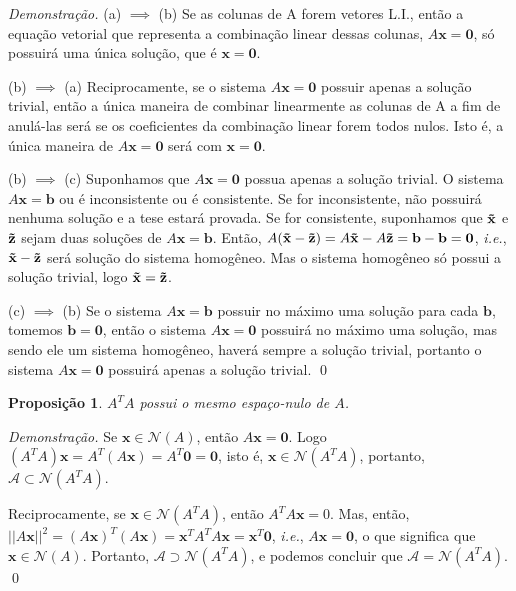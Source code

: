 \documentclass[a4paper, 12pt]{article}
\newtheorem{proposicao}{Proposição}
\theoremstyle{definition}
\newenvironment{demonstracao}{\noindent\textit{Demonstração.}}{\qed}
\theoremstyle{remark}
\begin{document}
\begin{demonstracao}
(a) $\implies$ (b) Se as colunas de A forem vetores L.I., então a equação vetorial que representa a combinação linear dessas colunas, $A\mathbf{x} = \mathbf{0}$, só possuirá uma única solução, que é $\mathbf{x} = \mathbf{0}$.

(b) $\implies$ (a) Reciprocamente, se o sistema $A\mathbf{x} = \mathbf{0}$ possuir apenas a solução trivial, então a única maneira de combinar linearmente as colunas de A a fim de anulá-las será se os coeficientes da combinação linear forem todos nulos. Isto é, a única maneira de $A\mathbf{x} = \mathbf{0}$ será com $\mathbf{x} = \mathbf{0}$.

(b) $\implies$ (c) Suponhamos que $A\mathbf{x} = \mathbf{0}$ possua apenas a solução trivial. O sistema $A\mathbf{x} = \mathbf{b}$ ou é inconsistente ou é consistente. Se for inconsistente, não possuirá nenhuma solução e a tese estará provada. Se for consistente, suponhamos que $\mathbf{\Tilde{x}}$ e $\mathbf{\Tilde{z}}$ sejam duas soluções de $A\mathbf{x} = \mathbf{b}$. Então, $A(\mathbf{\Tilde{x}} - \mathbf{\Tilde{z}}) = A\mathbf{\Tilde{x}} - A\mathbf{\Tilde{z}} = \mathbf{b} - \mathbf{b} = \mathbf{0}$, \textit{i.e.}, $\mathbf{\Tilde{x}} - \mathbf{\Tilde{z}}$ será solução do sistema homogêneo. Mas o sistema homogêneo só possui a solução trivial, logo $\mathbf{\Tilde{x}} = \mathbf{\Tilde{z}}$.

(c) $\implies$ (b) Se o sistema $A\mathbf{x} = \mathbf{b}$ possuir no máximo uma solução para cada $\mathbf{b}$, tomemos $\mathbf{b} = \mathbf{0}$, então o sistema $A\mathbf{x} = \mathbf{0}$ possuirá no máximo uma solução, mas sendo ele um sistema homogêneo, haverá sempre a solução trivial, portanto o sistema $A\mathbf{x} = \mathbf{0}$ possuirá apenas a solução trivial.
\end{demonstracao}

\begin{proposicao}
\label{mesmoespaconulo}
$A^TA$ possui o mesmo espaço-nulo de $A$.
\end{proposicao}

\begin{demonstracao}
Se $\mathbf{x} \in \mathcal{N}(A)$, então $A\mathbf{x} = \mathbf{0}$. Logo $(A^TA)\mathbf{x} = A^T(A\mathbf{x}) = A^T\mathbf{0} = \mathbf{0}$, isto é, $\mathbf{x} \in \mathcal{N}(A^TA)$, portanto, $\mathcal{A} \subset \mathcal{N}(A^TA)$.

Reciprocamente, se $\mathbf{x} \in \mathcal{N}(A^TA)$, então $A^TA\mathbf{x} = 0$. Mas, então, $||A\mathbf{x}||^2 = (A\mathbf{x})^T(A\mathbf{x}) = \mathbf{x}^TA^TA\mathbf{x} = \mathbf{x}^T\mathbf{0}$, \textit{i.e.}, $A\mathbf{x} = \mathbf{0}$, o que significa que $\mathbf{x} \in \mathcal{N}(A)$. Portanto, $\mathcal{A} \supset \mathcal{N}(A^TA)$, e podemos concluir que $\mathcal{A} = \mathcal{N}(A^TA)$.
\end{demonstracao}
\end{document}
